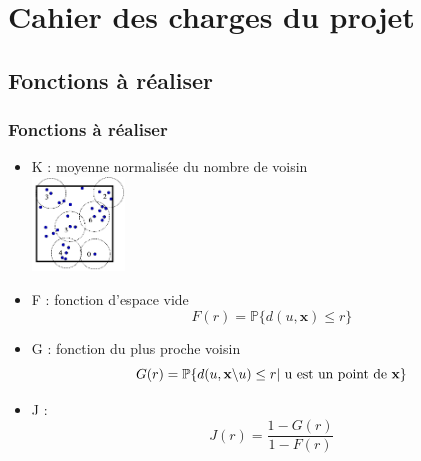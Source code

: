 \documentclass{beamer}
\theoremstyle{remark}
\theoremstyle{plain}
\begin{document}

\section{Cahier des charges du projet}
\label{sec:partie2}

\subsection{Fonctions à réaliser}
\begin{frame}
    \frametitle{Fonctions à réaliser}
    \begin{itemize}
    \item{K : moyenne normalisée du nombre de voisin \\
        \hspace{4cm}
        \includegraphics[height=2.5cm]{images/nombreVoisins2.png}
    } 
    \item{F : fonction d'espace vide 
      \begin{equation}
        F(r) = \mathbb{P}\{ d(u,\textbf{x}) \leq r \} 
      \end{equation}
    }
    \item{G : fonction du plus proche voisin 
    \begin{equation}
        G(r) = \mathbb{P}\{ d(u,\textbf{x}\backslash u) \leq r | \text{ u est un point de \textbf{x}} \} 
      \end{equation}
    }
    \item{J :
      \begin{equation}
        J(r) = \frac{1-G(r)}{1-F(r)}
      \end{equation}
    }
  \end{itemize}
\end{frame}
\end{document}
